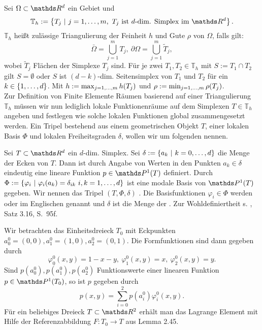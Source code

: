 Sei $\Omega\subset\R^d$ ein Gebiet und 
\[
\mathbb{T}_h := \penbrace{T_j~|~j=1\dt{,}m,~T_j\text{ ist $d$-dim. Simplex im }\R^d}.
\]
$\mathbb{T}_h$ heißt zulässige Triangulierung der Feinheit $h$ und Gute $\rho$ von $\Omega$, falls gilt:
\[
\bar{\Omega} = \bigcup\limits_{j=1}^{m} T_j,~\partial\Omega = \bigcup\limits_{j=1}^{m} \tilde{T}_j,
\]
wobei $\tilde{T}_j$ Flächen der Simplexe $T_j$ sind.
Für je zwei $T_1,T_2\in \mathbb{T}_h$ mit $S:=T_1\cap T_2$ gilt $S=\emptyset$ oder $S$ ist $(d-k)$-dim. Seitensimplex von $T_1$ und $T_2$ für ein $k\in \{1, \dots ,d\}$.
Mit $h:=\max_{j=1, \dots ,m}h(T_j)$ und $\rho := \min_{j=1, \dots ,m}\rho(T_j)$.\\

Zur Definition von Finite Elemente Räumen basierend auf einer Triangulierung $\mathbb{T}_h$ müssen wir nun lediglich lokale Funktionenräume auf dem Simplexen $T\in\mathbb{T}_h$ angeben und festlegen wie solche lokalen Funktionen global zusammengesetzt werden.
Ein Tripel bestehend aus einem geometrischen Objekt $T$, einer lokalen Basis $\Phi$ und lokalen Freiheitsgraden $\delta$, wollen wir um folgenden  nennen.

Sei $T\subset\R^d$ ein $d$-dim. Simplex.
Sei $\delta := \left\{a_k~|~k=0, \dots ,d\right\}$ die Menge der Ecken von $T$.
Dann ist durch Angabe von Werten in den Punkten $a_k\in \delta$ eindeutig eine lineare Funktion $p\in \Pw^1(T)$ definiert.
Durch $\Phi := \left\{\varphi_i~|~\varphi_i(a_k)=\delta_{ik}~i,k=1, \dots ,d\right\}$ ist eine modale Basis von $\Pw^1(T)$ gegeben.
Wir nennen das Tripel $(T,\Phi,\delta)$ .
Die Basisfunktionen $\varphi_i\in\Phi$ werden  oder im Englischen  genannt und $\delta$ ist die Menge der .
Zur Wohldefiniertheit s. \cite{Dziuk10}, Satz 3.16, S.~95f.

Wir betrachten das Einheitsdreieck $T_0$ mit Eckpunkten $a_0^0=(0,0),a_1^0=(1,0),a_2^0=(0,1)$.
Die Formfunktionen sind dann gegeben durch
\[
\varphi_0^0(x,y)= 1-x-y,~\varphi_1^0(x,y) = x,~\varphi_2^0(x,y) = y.
\]
Sind $p(a_0^0),p(a_1^0),p(a_2^0)$ Funktionswerte einer linearen Funktion $p\in\Pw^1(T_0)$, so ist $p$ gegeben durch
\[
p(x,y) = \sum_{i=0}^{2} p(a_i^0)\varphi_i^0(x,y).
\]
Für ein beliebiges Dreieck $T\subset\R^2$ erhält man das Lagrange Element mit Hilfe der Referenzabbildung $F:T_0\to T$ aus Lemma 2.45.

